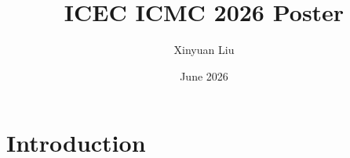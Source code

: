\documentclass{article}
\title{ICEC ICMC 2026 Poster}
\author{Xinyuan Liu}
\date{June 2026}
\begin{document}
\maketitle

\section{Introduction}
\end{document}
